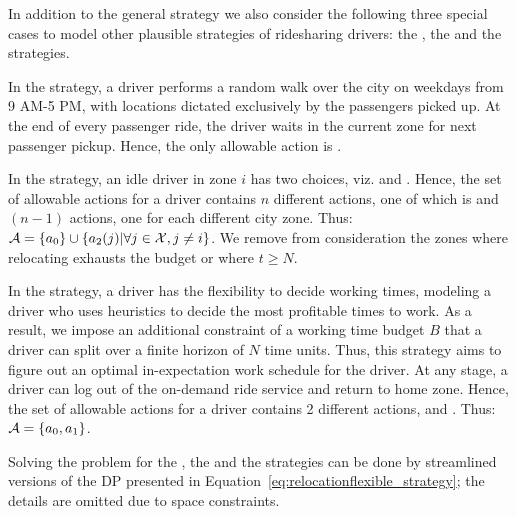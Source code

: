 { In addition to the general {\relocationflexible} strategy we also
consider the following three special cases to model other plausible strategies of ridesharing drivers: 
the {\naive}, the {\relocation} and the {\flexible} strategies.

In the {\naive} strategy, a driver performs a random walk over the city on weekdays from 9 AM-5 PM, with locations dictated exclusively by the passengers picked up. At the end of every passenger ride, the driver waits in the current zone for next passenger pickup. 
Hence, the only allowable action is {\getpassenger}.

In the {\relocation} strategy, an idle driver in zone $i$ has two choices, viz. {\getpassenger} and {\relocate}. Hence, the set of allowable actions for a driver contains $n$ different actions, one of which is {\getpassenger} and $(n-1)$ {\relocate} actions, one for each different city zone.  Thus: $
\mathcal{A} =  \{a_0\} \cup \{a_2(j) | \forall j \in \mathcal{X}, j \neq i \}
$.
We remove from consideration the zones where relocating exhausts the budget or where $t \geq N$.

In the {\flexible} strategy, a driver has the flexibility to decide working times, modeling a driver who uses heuristics to decide the most profitable times to work.   As a result, we impose an additional constraint of a working time budget $B$ that a driver can split over a finite horizon of $N$ time units. Thus, this strategy aims to figure out an optimal 
in-expectation work schedule for the driver.  
At any stage, a driver can log out of the on-demand ride service and return to home zone. Hence, the set of allowable actions for a driver contains 2 different actions, {\getpassenger} and {\gohome}.  Thus: $
\mathcal{A} = \{a_0, a_1\}$.

Solving the {\originalproblem} problem for the {\naive}, the {\relocation} and the
{\flexible} strategies can be done by streamlined versions of the DP presented in 
Equation~\eqref{eq:relocationflexible_strategy}; the details
are omitted due to space constraints.


\begin{comment}
\iffalse
We now consider strategic behavior, modeled through a set of strategies for how 
a rational Uber driver might undertake to maximize profit over the course of a 
40-hour workweek.  


\end{comment}}
